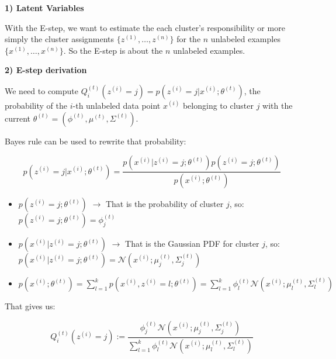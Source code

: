 \begin{answer}
    
    \textbf{1) Latent Variables}

    With the E-step, we want to estimate the each cluster's responsibility or more simply the cluster assignments $\{z^{(1)}, \ldots, z^{(n)}\}$ for the $n$ unlabeled examples $\{x^{(1)}, \ldots, x^{(n)}\}$. So the E-step is about the $n$ unlabeled examples.

    \textbf{2) E-step derivation}

    We need to compute $Q_i^{(t)}(z^{(i)}=j) = p(z^{(i)}=j | x^{(i)}; \theta^{(t)})$, the probability of the $i$-th unlabeled data point $x^{(i)}$ belonging to cluster $j$ with the current $\theta^{(t)} = (\phi^{(t)}, \mu^{(t)}, \Sigma^{(t)})$.

    Bayes rule can be used to rewrite that probability:

    $$p(z^{(i)}=j | x^{(i)}; \theta^{(t)}) = \frac{p(x^{(i)}|z^{(i)}=j; \theta^{(t)}) p(z^{(i)}=j; \theta^{(t)})}{p(x^{(i)}; \theta^{(t)})}$$

    \begin{itemize}
        \item $p(z^{(i)}=j; \theta^{(t)})$ $\rightarrow$ That is the probability of cluster $j$, so: $p(z^{(i)}=j; \theta^{(t)}) = \phi_j^{(t)}$
        \item $p(x^{(i)}|z^{(i)}=j; \theta^{(t)})$ $\rightarrow$ That is the Gaussian PDF for cluster $j$, so: $p(x^{(i)}|z^{(i)}=j; \theta^{(t)}) = \mathcal{N}(x^{(i)}; \mu_j^{(t)}, \Sigma_j^{(t)})$
        \item $p(x^{(i)}; \theta^{(t)}) = \sum_{l=1}^{k} p(x^{(i)}, z^{(i)}=l; \theta^{(t)}) = \sum_{l=1}^{k} \phi_l^{(t)} \mathcal{N}(x^{(i)}; \mu_l^{(t)}, \Sigma_l^{(t)})$
    \end{itemize}

    That gives us:

    $$Q_i^{(t)}(z^{(i)}=j) := \frac{\phi_j^{(t)} \mathcal{N}(x^{(i)}; \mu_j^{(t)}, \Sigma_j^{(t)})}{\sum_{l=1}^{k} \phi_l^{(t)} \mathcal{N}(x^{(i)}; \mu_l^{(t)}, \Sigma_l^{(t)})}$$
\end{answer}
